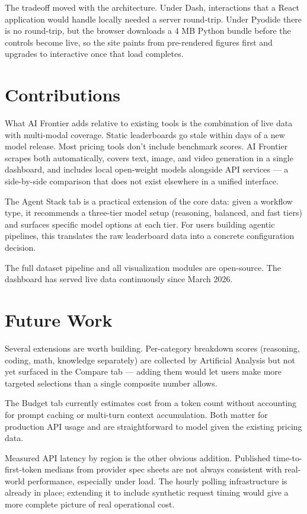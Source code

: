 \documentclass{article}
\begin{document}
The tradeoff moved with the architecture. Under Dash, interactions that a
React application would handle locally needed a server round-trip. Under
Pyodide there is no round-trip, but the browser downloads a 4 MB Python bundle
before the controls become live, so the site paints from pre-rendered figures
first and upgrades to interactive once that load completes.

\section{Contributions}

What AI Frontier adds relative to existing tools is the combination of live
data with multi-modal coverage. Static leaderboards go stale within days of a
new model release. Most pricing tools don't include benchmark scores. AI
Frontier scrapes both automatically, covers text, image, and video generation
in a single dashboard, and includes local open-weight models alongside API
services --- a side-by-side comparison that does not exist elsewhere in a
unified interface.

The Agent Stack tab is a practical extension of the core data: given a
workflow type, it recommends a three-tier model setup (reasoning, balanced,
and fast tiers) and surfaces specific model options at each tier. For users
building agentic pipelines, this translates the raw leaderboard data into a
concrete configuration decision.

The full dataset pipeline and all visualization modules are open-source.
The dashboard has served live data continuously since March 2026.

\section{Future Work}

Several extensions are worth building. Per-category breakdown scores
(reasoning, coding, math, knowledge separately) are collected by Artificial
Analysis but not yet surfaced in the Compare tab --- adding them would let users
make more targeted selections than a single composite number allows.

The Budget tab currently estimates cost from a token count without accounting
for prompt caching or multi-turn context accumulation. Both matter for
production API usage and are straightforward to model given the existing
pricing data.

Measured API latency by region is the other obvious addition. Published
time-to-first-token medians from provider spec sheets are not always
consistent with real-world performance, especially under load. The hourly
polling infrastructure is already in place; extending it to include synthetic
request timing would give a more complete picture of real operational cost.
\end{document}
